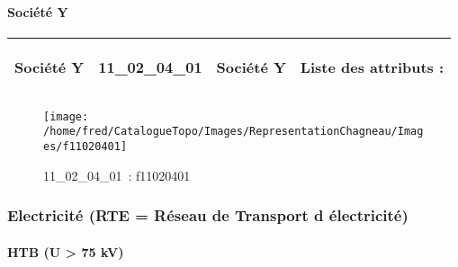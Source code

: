 \documentclass[12pt,titlepage]{book}
\begin{document}
\paragraph{Société Y}
\noindent
\vspace{\baselineskip}

\renewcommand{\arraystretch}{1.2}
\begin{supertabular}{|p{10cm}|c|p{13cm}|p{12cm}|}
 Société Y & 11\_02\_04\_01 & Société Y & Liste des attributs :
\begin{enumerate}
\end{enumerate}
\\
\hline
\end{supertabular}
\begin{figure}[h!]
  \hfill         %
  \begin{minipage}[t]{3cm}
    \begin{center}
      \texttt{[image: /home/fred/CatalogueTopo/Images/RepresentationChagneau/Images/f11020401]}
      \caption[~11\_02\_04\_01]{\small{11\_02\_04\_01~:} \tiny{f11020401}}\label{f11020401}
    \end{center}
  \end{minipage}
\end{figure}

\subsubsection{\large Electricité (RTE = Réseau de Transport d électricité)}
\paragraph{HTB (U > 75 kV)}
\noindent
\vspace{\baselineskip}
\end{document}
